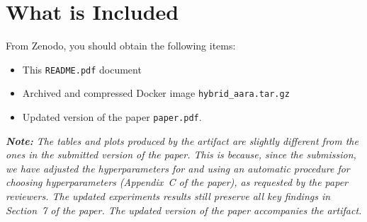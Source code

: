 
\section{What is Included}

From Zenodo, you should obtain the following items:
\begin{itemize}
  \item This \texttt{README.pdf} document
  \item Archived and compressed Docker image \texttt{hybrid\_aara.tar.gz}
  \item Updated version of the paper \texttt{paper.pdf}.
\end{itemize}

\emph{\textbf{Note:} The tables and plots produced by the artifact are slightly
  different from the ones in the submitted version of the paper.
  This is because, since the submission, we have adjusted the hyperparameters
  for \BayesWC{} and \BayesPC{} using an automatic procedure for choosing
  hyperparameters (Appendix~C of the paper), as requested by the paper
  reviewers.
  The updated experiments results still preserve all key findings in Section~7
  of the paper.
  The updated version of the paper accompanies the artifact.}



